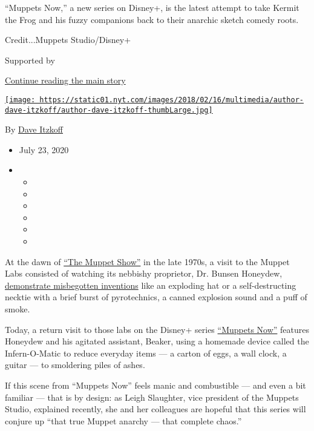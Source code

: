 ``Muppets Now,'' a new series on Disney+, is the latest attempt to take
Kermit the Frog and his fuzzy companions back to their anarchic sketch
comedy roots.

Credit...Muppets Studio/Disney+

Supported by

\protect\hyperlink{after-sponsor}{Continue reading the main story}

\href{https://www.nytimes.com/by/dave-itzkoff}{\texttt{[image: https://static01.nyt.com/images/2018/02/16/multimedia/author-dave-itzkoff/author-dave-itzkoff-thumbLarge.jpg]}}

By \href{https://www.nytimes.com/by/dave-itzkoff}{Dave Itzkoff}

\begin{itemize}
\item
  July 23, 2020
\item
  \begin{itemize}
  \item
  \item
  \item
  \item
  \item
  \item
  \end{itemize}
\end{itemize}

At the dawn of \href{https://www.youtube.com/watch?v=cE337D_V4vA}{``The
Muppet Show''} in the late 1970s, a visit to the Muppet Labs consisted
of watching its nebbishy proprietor, Dr. Bunsen Honeydew,
\href{https://www.youtube.com/watch?v=_j2pvi8FOQA\&t=5s}{demonstrate
misbegotten inventions} like an exploding hat or a self-destructing
necktie with a brief burst of pyrotechnics, a canned explosion sound and
a puff of smoke.

Today, a return visit to those labs on the Disney+ series
\href{https://disneyplusoriginals.disney.com/show/muppets-now}{``Muppets
Now''} features Honeydew and his agitated assistant, Beaker, using a
homemade device called the Infern-O-Matic to reduce everyday items --- a
carton of eggs, a wall clock, a guitar --- to smoldering piles of ashes.

If this scene from ``Muppets Now'' feels manic and combustible --- and
even a bit familiar --- that is by design: as Leigh Slaughter, vice
president of the Muppets Studio, explained recently, she and her
colleagues are hopeful that this series will conjure up ``that true
Muppet anarchy --- that complete chaos.''

